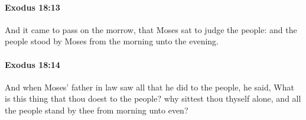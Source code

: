 		\paragraph{Exodus 18:13} %
			\label{EXODUS-18-13}

			And it came to pass on the morrow, that Moses sat to judge the people: and the people stood by Moses from the morning unto the evening.


		\paragraph{Exodus 18:14} %
			\label{EXODUS-18-14}

			And when Moses' father in law saw all that he did to the people, he said, What is this thing that thou doest to the people? why sittest thou thyself alone, and all the people stand by thee from morning unto even?


